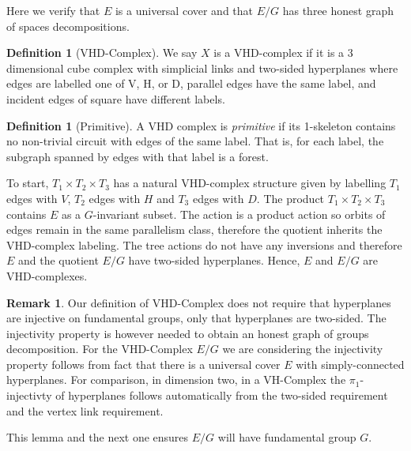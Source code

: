 \documentclass[12pt,parskip=full]{report}
\theoremstyle{plain}
\theoremstyle{definition}
\newtheorem{rmk}[thm]{Remark}
\newtheorem{dfn}[thm]{Definition}
\begin{document}
Here we verify that \(E\) is a universal cover and that \(E/G\) has three honest graph of spaces decompositions.

\begin{dfn}
    [VHD-Complex]
    \label{dfn:vhd}
    We say \(X\) is a VHD-complex if it is a 3 dimensional cube complex with simplicial links and two-sided hyperplanes where edges are labelled one of V, H, or D, parallel edges have the same label, and incident edges of square have different labels.
\end{dfn}

\begin{dfn}
    [Primitive]
    \label{dfn:primitive}
    A VHD complex is \emph{primitive} if its 1-skeleton contains no non-trivial circuit with edges of the same label. That is, for each label, the subgraph spanned by edges with that label is a forest.
\end{dfn}

To start, \(T_1\times T_2\times T_3\) has a natural VHD-complex structure given by labelling \(T_1\) edges with \(V\), \(T_2\) edges with \(H\) and \(T_3\) edges with \(D\). The product \(T_1\times T_2\times T_3\) contains \(E\) as a \(G\)-invariant subset. The action is a product action so orbits of edges remain in the same parallelism class, therefore the quotient inherits the VHD-complex labeling. The tree actions do not have any inversions and therefore \(E\) and the quotient \(E/G\) have two-sided hyperplanes. Hence, \(E\) and \(E/G\) are VHD-complexes.


\begin{rmk}
    Our definition of VHD-Complex does not require that hyperplanes are injective on fundamental groups, only that hyperplanes are two-sided. The injectivity property is  however needed to obtain an honest graph of groups decomposition. For the VHD-Complex \(E/G\) we are considering the injectivity property follows from fact that there is a universal cover \(E\) with simply-connected hyperplanes. For comparison, in dimension two, in a VH-Complex the \(\pi_1\)-injectivty of hyperplanes follows automatically from the two-sided requirement and the vertex link requirement.
\end{rmk}

This lemma and the next one ensures \(E/G\) will have fundamental group \(G\). 
\end{document}
